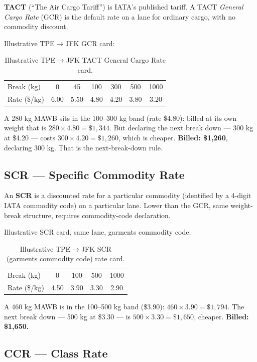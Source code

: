 \documentclass[11pt,a4paper]{article}
\theoremstyle{definition}
\begin{document}
\textbf{TACT} (``The Air Cargo Tariff'') is IATA's published tariff. A TACT
\emph{General Cargo Rate} (GCR) is the default rate on a lane for ordinary
cargo, with no commodity discount.

Illustrative TPE$\to$JFK GCR card:
\begin{table}[H]
\centering
\caption{Illustrative TPE$\to$JFK TACT General Cargo Rate card.}
\label{tab:tact-card}
\begin{tabular}{lcccccc}
\toprule
Break (kg)   & 0 & 45 & 100 & 300 & 500 & 1000 \\
Rate (\$/kg) & 6.00 & 5.50 & 4.80 & 4.20 & 3.80 & 3.20 \\
\bottomrule
\end{tabular}
\end{table}

A 280 kg MAWB sits in the 100--300 kg band (rate \$4.80): billed at its own
weight that is $280 \times 4.80 = \$1{,}344$. But declaring the next break
down --- 300 kg at \$4.20 --- costs $300 \times 4.20 = \$1{,}260$, which is
cheaper. \textbf{Billed: \$1{,}260}, declaring 300 kg. That is the
next-break-down rule.

\subsection{SCR --- Specific Commodity Rate}
\label{sec:appendix-scr}

An \textbf{SCR} is a discounted rate for a particular commodity (identified
by a 4-digit IATA commodity code) on a particular lane. Lower than the GCR,
same weight-break structure, requires commodity-code declaration.

Illustrative SCR card, same lane, garments commodity code:
\begin{table}[H]
\centering
\caption{Illustrative TPE$\to$JFK SCR (garments commodity code) rate card.}
\label{tab:scr-card}
\begin{tabular}{lcccc}
\toprule
Break (kg)   & 0 & 100 & 500 & 1000 \\
Rate (\$/kg) & 4.50 & 3.90 & 3.30 & 2.90 \\
\bottomrule
\end{tabular}
\end{table}

A 460 kg MAWB is in the 100--500 kg band (\$3.90): $460 \times 3.90 =
\$1{,}794$. The next break down --- 500 kg at \$3.30 --- is $500 \times 3.30 =
\$1{,}650$, cheaper. \textbf{Billed: \$1{,}650.}

\subsection{CCR --- Class Rate}
\label{sec:appendix-ccr}
\end{document}
